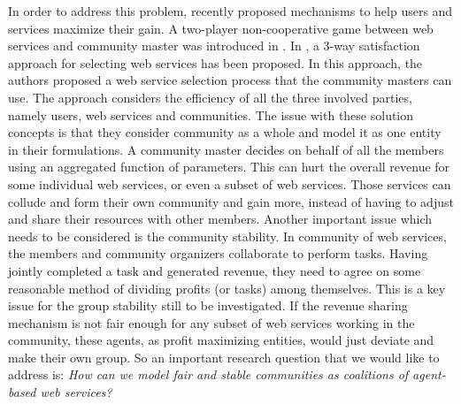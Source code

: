 In order to address this problem, recently
\cite{DBLP:conf/IEEEscc/LimTMB12,
DBLP:conf/IEEEscc/KhosravifarABT11, 10.1109/TSC.2012.12} proposed
mechanisms to help users and services maximize their gain. A
two-player non-cooperative game between web services and community
master was introduced in
\cite{DBLP:conf/IEEEscc/KhosravifarABT11}. In
\cite{DBLP:conf/IEEEscc/LimTMB12}, a 3-way satisfaction approach
for selecting web services has been proposed. In this approach,
the authors proposed a web service selection process that the
community masters can use. The approach considers the efficiency
of all the three involved parties, namely users, web services and
communities. The issue with these solution concepts is that they
consider community as a whole and model it as one entity in their
formulations. A community master decides on behalf of all the
members using an aggregated function of parameters. This can hurt
the overall revenue for some individual web services, or even a
subset of web services. Those services can collude and form their
own community and gain more, instead of having to adjust and share
their resources with other members. Another important issue which
needs to be considered is the community stability. In community of
web services, the members and community organizers collaborate to
perform tasks. Having jointly completed a task and generated
revenue, they need to agree on some reasonable method of dividing
profits (or tasks) among themselves. This is a key issue for the
group stability still to be investigated. If the revenue sharing
mechanism is not fair enough for any subset of web services
working in the community, these agents, as profit maximizing
entities, would just deviate and make their own group. So an
important research question that we would like to address is:
\emph{How can we model fair and stable communities as coalitions
of agent-based web services?}





